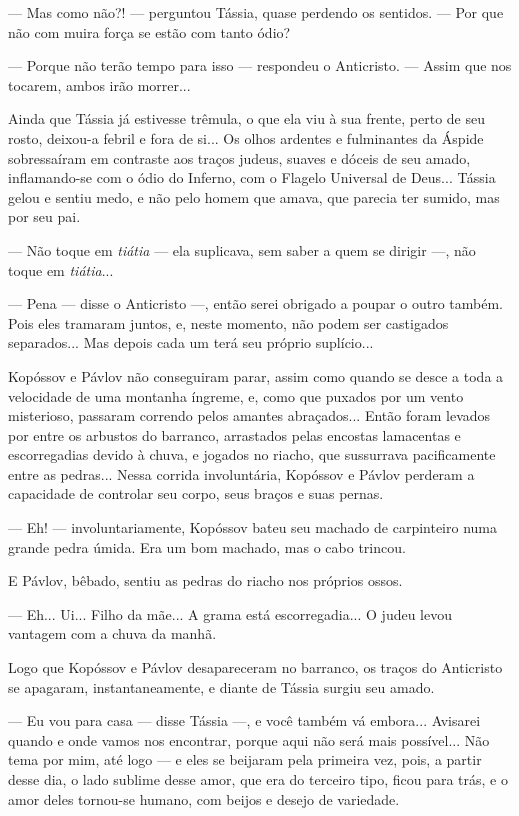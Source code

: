 --- Mas como não?! --- perguntou Tássia, quase perdendo os sentidos. ---
Por que não com muira força se estão com tanto ódio?

--- Porque não terão tempo para isso --- respondeu o Anticristo. ---
Assim que nos tocarem, ambos irão morrer...

Ainda que Tássia já estivesse trêmula, o que ela viu à sua frente, perto
de seu rosto, deixou-a febril e fora de si... Os olhos ardentes e
fulminantes da Áspide sobressaíram em contraste aos traços judeus,
suaves e dóceis de seu amado, inflamando-se com o ódio do Inferno, com o
Flagelo Universal de Deus... Tássia gelou e sentiu medo, e não pelo
homem que amava, que parecia ter sumido, mas por seu pai.

--- Não toque em \emph{tiátia} --- ela suplicava, sem saber a quem se
dirigir ---, não toque em \emph{tiátia}...

--- Pena --- disse o Anticristo ---, então serei obrigado a poupar o
outro também. Pois eles tramaram juntos, e, neste momento, não podem ser
castigados separados... Mas depois cada um terá seu próprio suplício...

Kopóssov e Pávlov não conseguiram parar, assim como quando se desce a
toda a velocidade de uma montanha íngreme, e, como que puxados por um
vento misterioso, passaram correndo pelos amantes abraçados... Então
foram levados por entre os arbustos do barranco, arrastados pelas
encostas lamacentas e escorregadias devido à chuva, e jogados no riacho,
que sussurrava pacificamente entre as pedras... Nessa corrida
involuntária, Kopóssov e Pávlov perderam a capacidade de controlar seu
corpo, seus braços e suas pernas.

--- Eh! --- involuntariamente, Kopóssov bateu seu machado de carpinteiro
numa grande pedra úmida. Era um bom machado, mas o cabo trincou.

E Pávlov, bêbado, sentiu as pedras do riacho nos próprios ossos.

--- Eh... Ui... Filho da mãe... A grama está escorregadia... O judeu
levou vantagem com a chuva da manhã.

Logo que Kopóssov e Pávlov desapareceram no barranco, os traços do
Anticristo se apagaram, instantaneamente, e diante de Tássia surgiu seu
amado.

--- Eu vou para casa --- disse Tássia ---, e você também vá embora...
Avisarei quando e onde vamos nos encontrar, porque aqui não será mais
possível... Não tema por mim, até logo --- e eles se beijaram pela
primeira vez, pois, a partir desse dia, o lado sublime desse amor, que
era do terceiro tipo, ficou para trás, e o amor deles tornou-se humano,
com beijos e desejo de variedade.

